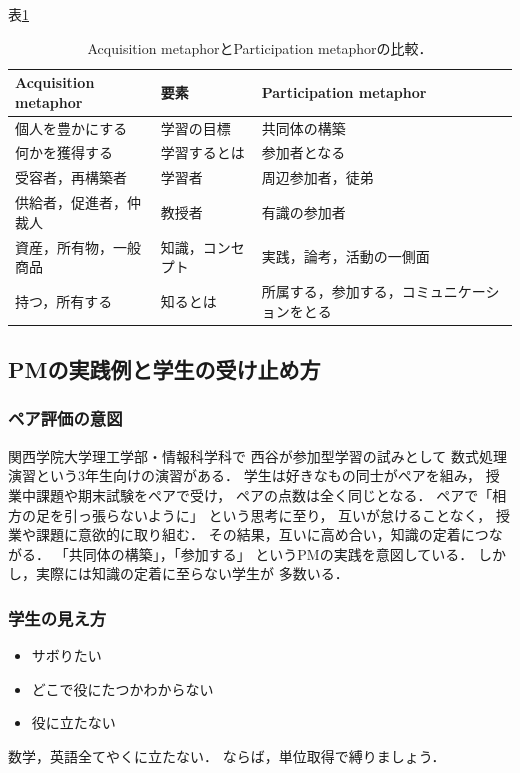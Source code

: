 \documentclass{hissymp}
\begin{document}
表\ref{tab:org878d9c9}

\begin{table}[bt]
\caption{\label{tab:org878d9c9}
Acquisition metaphorとParticipation metaphorの比較．}
\centering
\begin{tabular}{lll}
\hline
Acquisition metaphor & 要素 & Participation metaphor\\
\hline
個人を豊かにする & 学習の目標 & 共同体の構築\\
何かを獲得する & 学習するとは & 参加者となる\\
受容者，再構築者 & 学習者 & 周辺参加者，徒弟\\
供給者，促進者，仲裁人 & 教授者 & 有識の参加者\\
資産，所有物，一般商品 & 知識，コンセプト & 実践，論考，活動の一側面\\
持つ，所有する & 知るとは & 所属する，参加する，コミュニケーションをとる\\
\hline
\end{tabular}
\end{table}

\subsection{PMの実践例と学生の受け止め方}
\label{sec:org81f0b6c}
\subsubsection{ペア評価の意図}
\label{sec:org6d731f7}
関西学院大学理工学部・情報科学科で
西谷が参加型学習の試みとして
数式処理演習という3年生向けの演習がある．
学生は好きなもの同士がペアを組み，
授業中課題や期末試験をペアで受け，
ペアの点数は全く同じとなる．
ペアで「相方の足を引っ張らないように」
という思考に至り，
互いが怠けることなく，
授業や課題に意欲的に取り組む．
その結果，互いに高め合い，知識の定着につながる．
「共同体の構築」，「参加する」
というPMの実践を意図している．
しかし，実際には知識の定着に至らない学生が
多数いる．
\subsubsection{学生の見え方}
\label{sec:orgbfbc9c1}
\begin{itemize}
\item サボりたい
\item どこで役にたつかわからない
\item 役に立たない
\end{itemize}
数学，英語全てやくに立たない．
ならば，単位取得で縛りましょう．
\end{document}
